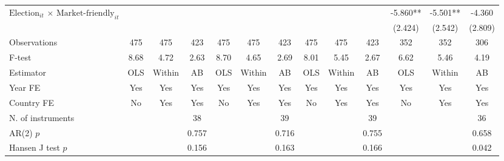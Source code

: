 \begin{longtable}{m{5cm}*{12}{c}}
\multirow{2}{5cm}{$\text{Election}_{it}$ $\times$ $\text{Market-friendly}_{it}$}&               &               &               &               &               &               &               &               &               &      -5.860** &      -5.501** &      -4.360   \\
                    &               &               &               &               &               &               &               &               &               &     (2.424)   &     (2.542)   &     (2.809)   \\
\midrule
Observations        &         475   &         475   &         423   &         475   &         475   &         423   &         475   &         475   &         423   &         352   &         352   &         306   \\
F-test              &        8.68   &        4.72   &        2.63   &        8.70   &        4.65   &        2.69   &        8.01   &        5.45   &        2.67   &        6.62   &        5.46   &        4.19   \\
Estimator           &         OLS   &      Within   &          AB   &         OLS   &      Within   &          AB   &         OLS   &      Within   &          AB   &         OLS   &      Within   &          AB   \\
Year FE             &         Yes   &         Yes   &         Yes   &         Yes   &         Yes   &         Yes   &         Yes   &         Yes   &         Yes   &         Yes   &         Yes   &         Yes   \\
Country FE          &          No   &         Yes   &         Yes   &          No   &         Yes   &         Yes   &          No   &         Yes   &         Yes   &          No   &         Yes   &         Yes   \\
N. of instruments   &               &               &          38   &               &               &          39   &               &               &          39   &               &               &          36   \\
AR(2) \(p\)         &               &               &       0.757   &               &               &       0.716   &               &               &       0.755   &               &               &       0.658   \\
Hansen J test \(p\) &               &               &       0.156   &               &               &       0.163   &               &               &       0.166   &               &               &       0.042   \\

\end{longtable}
